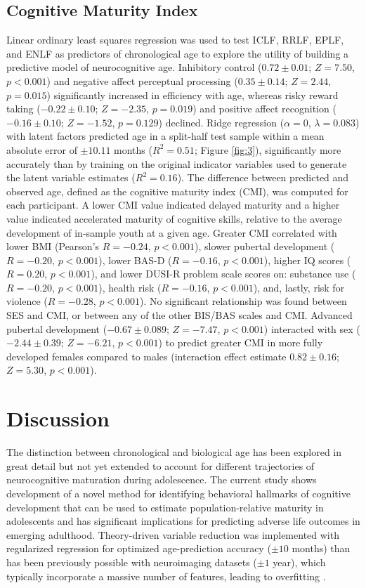 \documentclass{article}%
\begin{document}
\subsection*{Cognitive Maturity Index} Linear ordinary least squares regression was used to test ICLF, RRLF, EPLF, and ENLF as predictors of chronological age to explore the utility of building a predictive model of neurocognitive age. Inhibitory control ($0.72\pm0.01$; $Z=7.50$, $p<0.001$) and negative affect perceptual processing ($0.35\pm0.14$; $Z=2.44$, $p=0.015$) significantly increased in efficiency with age, whereas risky reward taking ($-0.22\pm0.10$; $Z=-2.35$, $p = 0.019$) and positive affect recognition ($-0.16\pm0.10$; $Z=-1.52$, $p=0.129$) declined. Ridge regression ($\alpha = 0$, $\lambda = 0.083$) with latent factors predicted age in a split-half test sample within a mean absolute error of $\pm 10.11$ months ($R^2=0.51$; Figure \ref{fig:3}), significantly more accurately than by training on the original indicator variables used to generate the latent variable estimates ($R^2=0.16$). The difference between predicted and observed age, defined as the cognitive maturity index (CMI), was computed for each participant. A lower CMI value indicated delayed maturity and a higher value indicated accelerated maturity of cognitive skills, relative to the average development of in-sample youth at a given age. Greater CMI correlated with lower BMI (Pearson's $R=-0.24$, $p<0.001$), slower pubertal development ($R=-0.20$, $p<0.001$), lower BAS-D ($R=-0.16$, $p<0.001$), higher IQ scores ($R=0.20$, $p<0.001$), and lower DUSI-R problem scale scores on: substance use ($R=-0.20$, $p<0.001$), health risk ($R=-0.16$, $p<0.001$), and, lastly, risk for violence ($R=-0.28$, $p<0.001$). No significant relationship was found between SES and CMI, or between any of the other BIS/BAS scales and CMI. Advanced pubertal development ($-0.67\pm0.089$; $Z=-7.47$, $p<0.001$) interacted with sex ($-2.44\pm0.39$; $Z=-6.21$, $p<0.001$) to predict greater CMI in more fully developed females compared to males (interaction effect estimate $0.82\pm0.16$; $Z=5.30$, $p<0.001$).
%
\section*{Discussion} The distinction between chronological and biological age has been explored in great detail but not yet extended to account for different trajectories of neurocognitive maturation during adolescence. The current study shows development of a novel method for identifying behavioral hallmarks of cognitive development that can be used to estimate population-relative maturity in adolescents and has significant implications for predicting adverse life outcomes in emerging adulthood. Theory-driven variable reduction was implemented with regularized regression for optimized age-prediction accuracy ($\pm 10$ months) than has been previously possible with neuroimaging datasets ($\pm1$ year), which typically incorporate a massive number of features, leading to overfitting \citep{cole2017predicting, franke2012brain}. 
\vspace{4pt}
\end{document}
